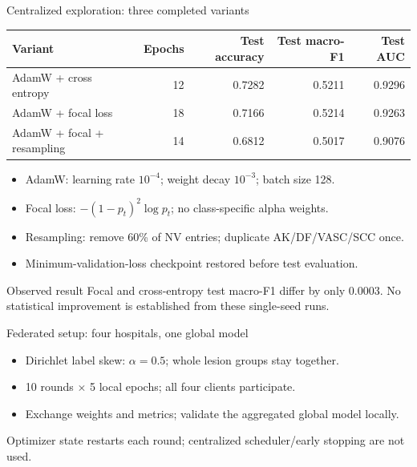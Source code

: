 \documentclass[aspectratio=169,11pt]{beamer}
\begin{document}
\begin{frame}{Centralized exploration: three completed variants}
\small
\begin{tabular}{lrrrr}
\toprule
Variant & Epochs & Test accuracy & Test macro-F1 & Test AUC\\
\midrule
AdamW + cross entropy & 12 & 0.7282 & 0.5211 & 0.9296\\
AdamW + focal loss & 18 & 0.7166 & 0.5214 & 0.9263\\
AdamW + focal + resampling & 14 & 0.6812 & 0.5017 & 0.9076\\
\bottomrule
\end{tabular}
\vspace{4mm}
\begin{itemize}
\item AdamW: learning rate $10^{-4}$; weight decay $10^{-3}$; batch size 128.
\item Focal loss: $-(1-p_t)^2\log p_t$; no class-specific alpha weights.
\item Resampling: remove 60\% of NV entries; duplicate AK/DF/VASC/SCC once.
\item Minimum-validation-loss checkpoint restored before test evaluation.
\end{itemize}
\begin{block}{Observed result}
Focal and cross-entropy test macro-F1 differ by only 0.0003. No statistical improvement is established from these single-seed runs.
\end{block}
\end{frame}

\begin{frame}{Federated setup: four hospitals, one global model}
\centering
{}
\vspace{3mm}
\begin{itemize}
\item Dirichlet label skew: $\alpha=0.5$; whole lesion groups stay together.
\item 10 rounds $\times$ 5 local epochs; all four clients participate.
\item Exchange weights and metrics; validate the aggregated global model locally.
\end{itemize}
\small Optimizer state restarts each round; centralized scheduler/early stopping are not used.
\end{frame}
\end{document}
